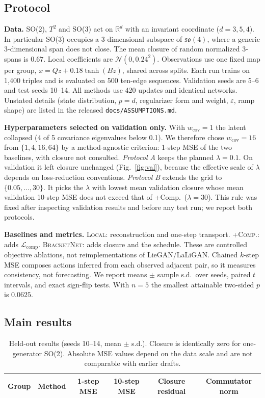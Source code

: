 \documentclass[10pt]{article}
\newcommand{\so}{\mathfrak{so}}
\begin{document}
\subsection{Protocol}
\textbf{Data.} SO(2), $T^2$ and SO(3) act on $\mathbb R^d$ with an invariant coordinate ($d=3,5,4$). In particular
SO(3) occupies a 3-dimensional subspace of $\so(4)$, where a generic 3-dimensional span does not close. The mean
closure of random normalized 3-spans is $0.67$. Local coefficients are $\mathcal N(0,0.24^2)$. Observations use one
fixed map per group, $x=Qz+0.18\tanh(Bz)$, shared across splits. Each run trains on 1,400 triples and is evaluated on
500 ten-edge sequences. Validation seeds are 5--6 and test seeds 10--14. All methods use 420 updates and identical
networks. Unstated details (state distribution, $p=d$, regularizer form and weight, $\varepsilon$, ramp shape) are
listed in the released \texttt{docs/ASSUMPTIONS.md}.

\textbf{Hyperparameters selected on validation only.} With $w_{\mathrm{cov}}=1$ the latent collapsed (4 of 5
covariance eigenvalues below 0.1). We therefore chose $w_{\mathrm{cov}}=16$ from $\{1,4,16,64\}$ by a
method-agnostic criterion: 1-step MSE of the two baselines, with closure not consulted. \emph{Protocol A} keeps the
planned $\lambda=0.1$. On validation it left closure unchanged (Fig.~\ref{fig:val}), because the effective scale of
$\lambda$ depends on loss-reduction conventions. \emph{Protocol B} extends the grid to $\{0.05,\dots,30\}$. It picks
the $\lambda$ with lowest mean validation closure whose mean validation 10-step MSE does not exceed that of
+Comp.\ ($\lambda=30$). This rule was fixed after inspecting validation results and before any test run; we report
both protocols.

\textbf{Baselines and metrics.} \textsc{Local}: reconstruction and one-step transport. \textsc{+Comp.}: adds
$\mathcal L_{\mathrm{comp}}$. \textsc{BracketNet}: adds closure and the schedule. These are controlled objective
ablations, not reimplementations of LieGAN/LaLiGAN. Chained $k$-step MSE composes actions inferred from each
observed adjacent pair, so it measures consistency, not forecasting. We report means $\pm$ sample s.d.\ over seeds,
paired $t$ intervals, and exact sign-flip tests. With $n=5$ the smallest attainable two-sided $p$ is $0.0625$.

\subsection{Main results}
\begin{table}[t]
\centering\small
\caption{Held-out results (seeds 10--14, mean $\pm$ s.d.). Closure is identically zero for one-generator SO(2).
Absolute MSE values depend on the data scale and are not comparable with earlier drafts.}
\label{tab:main}
\begin{tabular}{llcccc}
\toprule
Group & Method & 1-step MSE & 10-step MSE & Closure residual & Commutator norm\\
\midrule

\bottomrule
\end{tabular}
\end{table}
\end{document}
